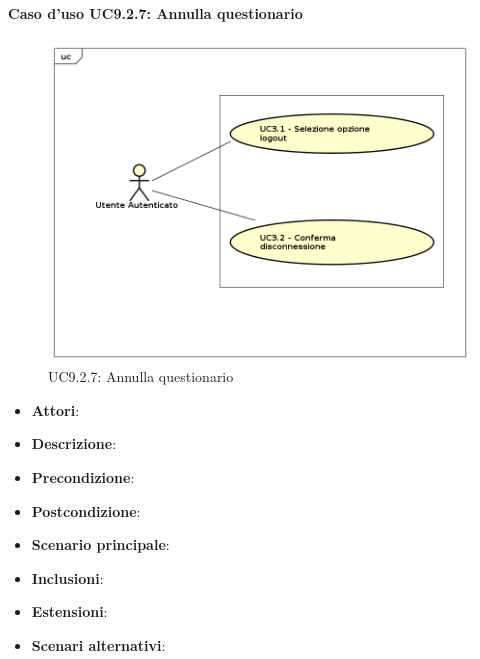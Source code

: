 		\paragraph{Caso d'uso UC9.2.7: Annulla questionario}
		\label{UC9.2.7}
		\begin{figure}[h]
			\centering
		\includegraphics[scale=0.7,keepaspectratio]{UML/UC9.png}
			\caption{UC9.2.7: Annulla questionario}
		\end{figure}
		\FloatBarrier
		\begin{itemize}
			\item \textbf{Attori}: 
			\item \textbf{Descrizione}: 
			\item \textbf{Precondizione}: 
			\item \textbf{Postcondizione}: 
			\item \textbf{Scenario principale}:
			\item \textbf{Inclusioni}:
			\item \textbf{Estensioni}:
			\item \textbf{Scenari alternativi}:
		\end{itemize}

		